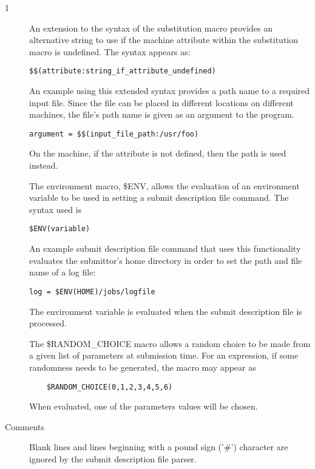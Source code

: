 \begin{ManPage}{\label{man-condor-submit}}{1}
\begin{description}
An extension to the syntax of the substitution macro provides an
alternative string to use if the machine attribute within the
substitution macro is undefined.
The syntax appears as:
\begin{verbatim} 
$$(attribute:string_if_attribute_undefined)
\end{verbatim}

An example using this extended syntax provides a path name to a
required input file.
Since the file can be placed in different locations on
different machines, the file's path name is given as an argument
to the program.
\begin{verbatim} 
argument = $$(input_file_path:/usr/foo)
\end{verbatim}
On the machine, if the attribute  is not
defined, then the path  is used instead.

The environment macro, \$ENV, allows the evaluation of an environment
variable to be used in setting a submit description file command.
The syntax used is
\begin{verbatim} 
$ENV(variable)
\end{verbatim}
An example submit description file command that uses this functionality
evaluates the submittor's home directory in order to set the
path and file name of a log file:
\begin{verbatim} 
log = $ENV(HOME)/jobs/logfile
\end{verbatim}
The environment variable is evaluated when the submit description
file is processed.

The \$RANDOM\_CHOICE macro allows a random choice to be made
from a given list of parameters at submission time.
For an expression, if some randomness needs to be generated,
the macro may appear as
\begin{verbatim} 
    $RANDOM_CHOICE(0,1,2,3,4,5,6)
\end{verbatim}
When evaluated, one of the parameters values will be chosen. 

\item[Comments] Blank lines and lines beginning with a 
pound sign
('\#')
character are ignored by the submit description file parser. 


\end{description}
\end{ManPage}
